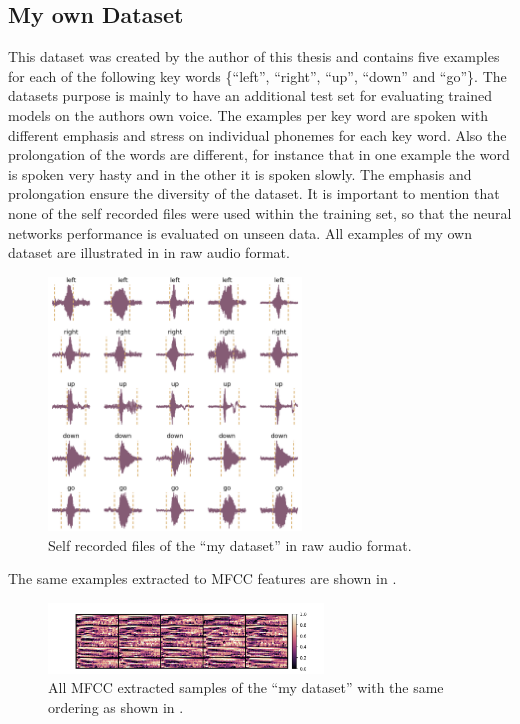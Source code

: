 \FloatBarrier
\noindent



\subsection{My own Dataset}\label{sec:exp_dataset_my}
This dataset was created by the author of this thesis and contains five examples for each of the following key words \{\enquote{left}, \enquote{right}, \enquote{up}, \enquote{down} and \enquote{go}\}.
The datasets purpose is mainly to have an additional test set for evaluating trained models on the authors own voice.
The examples per key word are spoken with different emphasis and stress on individual phonemes for each key word.
Also the prolongation of the words are different, for instance that in one example the word is spoken very hasty and in the other it is spoken slowly.
The emphasis and prolongation ensure the diversity of the dataset.
It is important to mention that none of the self recorded files were used within the training set, so that the neural networks performance is evaluated on unseen data.
All examples of my own dataset are illustrated in  in raw audio format.
\begin{figure}[!ht]
  \centering
    \includegraphics[width=0.6\textwidth]{./5_exp/figs/exp_dataset_my_wav_grid.png}
  \caption{Self recorded files of the \enquote{my dataset} in raw audio format.}
  \label{fig:exp_dataset_my_wav_grid}
\end{figure}
\FloatBarrier
\noindent
The same examples extracted to MFCC features are shown in .
\begin{figure}[!ht]
  \centering
    \includegraphics[width=0.65\textwidth]{./5_exp/figs/exp_dataset_my_mfcc.png}
  \caption{All MFCC extracted samples of the \enquote{my dataset} with the same ordering as shown in .}
  \label{fig:exp_dataset_my_mfcc}
\end{figure}
